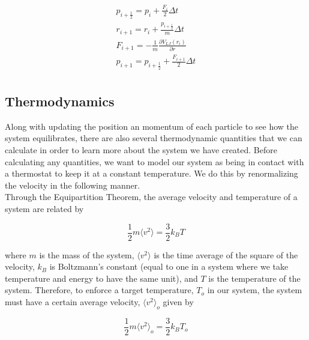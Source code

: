 \documentclass{article}
\begin{document}
\begin{multicols}{2}

\begin{equation}
\label{verletvscheme}
\begin{split}
p_{i+\frac{1}{2}}=p_i + \frac{F_i}{2} \Delta t \\
r_{i+1}=r_i+\frac{p_{i+\frac{1}{2}}}{m} \Delta t \\
F_{i+1}=-\frac{1}{m} \frac{\partial V_{LJ}(r_i)}{\partial r} \\
p_{i+1} = p_{i+\frac{1}{2}} + \frac{F_{i+1}}{2} \Delta t \\
\end{split}
\end{equation}

\subsection{Thermodynamics}
\label{thermo}

Along with updating the position an momentum of each particle to see how the system equilibrates, there are also several thermodynamic quantities that we can calculate in order to learn more about the system we have created.  Before calculating any quantities, we want to model our system as being in contact with a thermostat to keep it at a constant temperature.  We do this by renormalizing the velocity in the following manner.  \\

Through the Equipartition Theorem, the average velocity and temperature of a system are related by

\begin{equation}
\label{vir}
\frac{1}{2}m \langle v^2 \rangle = \frac{3}{2} k_B T
\end{equation}

\noindent where $m$ is the mass of the system, $\langle v^2 \rangle$ is the time average of the square of the velocity, $k_B$ is Boltzmann's constant (equal to one in a system where we take temperature and energy to have the same unit), and $T$ is the temperature of the system.  Therefore, to enforce a target temperature, $T_o$ in our system, the system must have a certain average velocity, $\langle v^2 \rangle _o$ given by

\begin{equation}
\label{virknot}
\frac{1}{2}m \langle v^2 \rangle _o = \frac{3}{2} k_B T_o
\end{equation}


\end{multicols}
\end{document}
